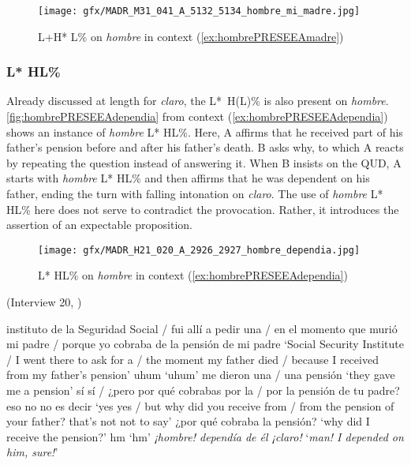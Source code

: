 \begin{figure}
	\texttt{[image: gfx/MADR\_M31\_041\_A\_5132\_5134\_hombre\_mi\_madre.jpg]}
	\caption[L+H* L\% on \textit{hombre} in context (\ref{ex:hombrePRESEEAmadre})]{L+H* L\% on \textit{hombre} in context (\ref{ex:hombrePRESEEAmadre}) \href{https://osf.io/v97bu/}{\faVolumeUp} \label{fig:hombrePRESEEAmadre}}
\end{figure}

\subsubsection{L* HL\%}
\label{ch:5.2.2.2}

Already discussed at length for \textit{claro}, the L*~H(L)\% is also present on \textit{hombre}. \autoref{fig:hombrePRESEEAdependia} from context (\ref{ex:hombrePRESEEAdependia}) shows an instance of \textit{hombre} L* HL\%. Here, A affirms that he received part of his father's pension before and after his father's death. B asks why, to which A reacts by repeating the question instead of answering it. When B insists on the \ac{QUD}, A starts with \textit{hombre} L* HL\% and then affirms that he was dependent on his father, ending the turn with falling intonation on \textit{claro}. The use of \textit{hombre} L* HL\% here does not serve to contradict the provocation. Rather, it introduces the assertion of an expectable proposition.\largerpage

\begin{figure}[p]
	\texttt{[image: gfx/MADR\_H21\_020\_A\_2926\_2927\_hombre\_dependia.jpg]}
	\caption{L* HL\% on \textit{hombre} in context (\ref{ex:hombrePRESEEAdependia}) \href{https://osf.io/9bvg4/}{\faVolumeUp} \label{fig:hombrePRESEEAdependia}}
\end{figure}\clearpage

\begin{exe}
	\ex (Interview 20, \cite{PRESEEA.20142020})\label{ex:hombrePRESEEAdependia}
	\begin{xlist}[A:]
	  instituto de la Seguridad Social / fui allí a pedir una / en el momento que murió mi padre / porque yo cobraba de la pensión de mi padre
	\glt `Social Security Institute / I went there to ask for a / the moment my father died / because I received from my father's pension'
	  uhum 
	\glt `uhum'
	  me dieron una / una pensión
	\glt `they gave me a pension'
	  sí sí / ¿pero por qué cobrabas por la / por la pensión de tu padre? eso no no es decir 
	\glt `yes yes / but why did you receive from / from the pension of your father? that's not not to say'
	  ¿por qué cobraba la pensión? 
	\glt `why did I receive the pension?' 
	  hm 
	\glt `hm'
	  \textit{¡hombre! dependía de él ¡claro!} 
	\glt `\textit{man! I depended on him, sure!}'
	\end{xlist}
\end{exe}

